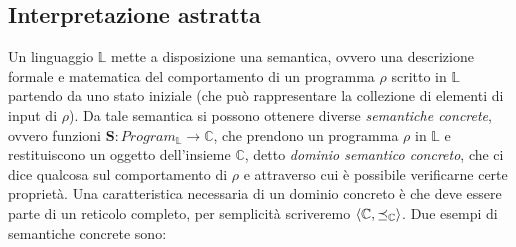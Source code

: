 \subsection{Interpretazione astratta}
Un linguaggio \(\mathbb{L}\) mette a disposizione una semantica, ovvero una descrizione formale e matematica del comportamento di un programma \(\rho\) scritto in \(\mathbb{L}\) partendo da uno stato iniziale (che può rappresentare la collezione di elementi di input di \(\rho\)). Da tale semantica si possono ottenere diverse \textit{semantiche concrete}, ovvero funzioni \(\textbf{S}:Program_\mathbb{L}\rightarrow \mathbb{C}\),  che prendono un programma \(\rho\) in \(\mathbb{L}\) e restituiscono un oggetto dell'insieme \(\mathbb{C}\), detto \textit{dominio semantico concreto}, che ci dice qualcosa sul comportamento di \(\rho\) e attraverso cui è possibile verificarne certe proprietà. Una caratteristica necessaria di un dominio concreto è che deve essere parte di un reticolo completo, per semplicità scriveremo \(\langle \mathbb{C}, \preceq_{\mathbb{C}}\rangle\). Due esempi di semantiche concrete sono:
